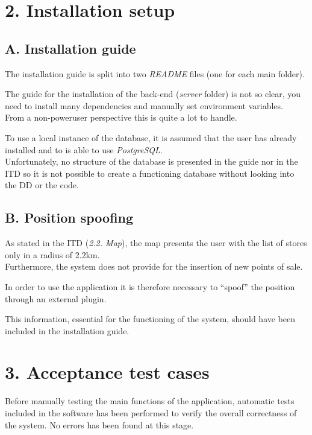 \chapter{2. Installation setup}

\section{A. Installation guide}

The installation guide is split into two \emph{README} files (one for each main folder).

The guide for the installation of the back-end (\emph{server} folder) is not so clear, you need to install many dependencies and manually set environment variables.\\
From a non-poweruser perspective this is quite a lot to handle.

To use a local instance of the database, it is assumed that the user has already installed and to is able to use \emph{PostgreSQL}.\\
Unfortunately, no structure of the database is presented in the guide nor in the ITD so it is not possible to create a functioning database without looking into the DD or the code.

\section{B. Position spoofing}

As stated in the ITD (\emph{2.2. Map}), the map presents the user with the list of stores only in a radius of 2.2km.\\
Furthermore, the system does not provide for the insertion of new points of sale.

In order to use the application it is therefore necessary to ``spoof'' the position through an external plugin.

This information, essential for the functioning of the system, should have been included in the installation guide.

\chapter{3. Acceptance test cases}

Before manually testing the main functions of the application, automatic tests included in the software has been performed to verify the overall correctness of the system.
No errors has been found at this stage.

